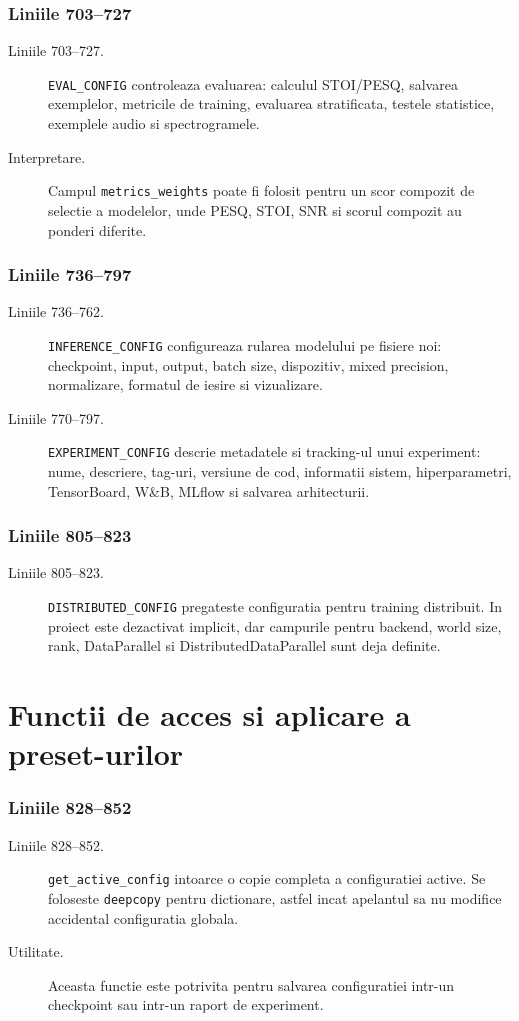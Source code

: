 \documentclass[12pt,a4paper]{report}
\newcommand{\codechunk}[2]{%
\subsection*{Liniile #1--#2}

}
\begin{document}
\codechunk{703}{727}

\begin{description}
    \item[Liniile 703--727.] \texttt{EVAL\_CONFIG} controleaza evaluarea: calculul
    STOI/PESQ, salvarea exemplelor, metricile de training, evaluarea stratificata,
    testele statistice, exemplele audio si spectrogramele.

    \item[Interpretare.] Campul \texttt{metrics\_weights} poate fi folosit pentru
    un scor compozit de selectie a modelelor, unde PESQ, STOI, SNR si scorul
    compozit au ponderi diferite.
\end{description}

\codechunk{736}{797}

\begin{description}
    \item[Liniile 736--762.] \texttt{INFERENCE\_CONFIG} configureaza rularea modelului
    pe fisiere noi: checkpoint, input, output, batch size, dispozitiv, mixed
    precision, normalizare, formatul de iesire si vizualizare.

    \item[Liniile 770--797.] \texttt{EXPERIMENT\_CONFIG} descrie metadatele si
    tracking-ul unui experiment: nume, descriere, tag-uri, versiune de cod,
    informatii sistem, hiperparametri, TensorBoard, W\&B, MLflow si salvarea
    arhitecturii.
\end{description}

\codechunk{805}{823}

\begin{description}
    \item[Liniile 805--823.] \texttt{DISTRIBUTED\_CONFIG} pregateste configuratia
    pentru training distribuit. In proiect este dezactivat implicit, dar campurile
    pentru backend, world size, rank, DataParallel si DistributedDataParallel sunt
    deja definite.
\end{description}

\chapter{Functii de acces si aplicare a preset-urilor}

\codechunk{828}{852}

\begin{description}
    \item[Liniile 828--852.] \texttt{get\_active\_config} intoarce o copie completa
    a configuratiei active. Se foloseste \texttt{deepcopy} pentru dictionare, astfel
    incat apelantul sa nu modifice accidental configuratia globala.

    \item[Utilitate.] Aceasta functie este potrivita pentru salvarea configuratiei
    intr-un checkpoint sau intr-un raport de experiment.
\end{description}
\end{document}
